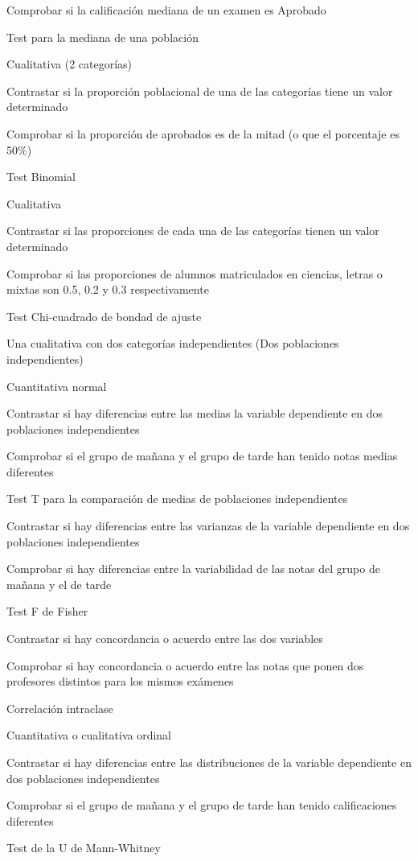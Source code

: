 \documentclass[
  a4paper,
]{scrreport}
\theoremstyle{definition}
\theoremstyle{definition}
\theoremstyle{remark}
\begin{document}
Comprobar si la calificación mediana de un examen es Aprobado

Test para la mediana de una población

Cualitativa (2 categorías)

Contrastar si la proporción poblacional de una de las categorías tiene
un valor determinado

Comprobar si la proporción de aprobados es de la mitad (o que el
porcentaje es 50\%)

Test Binomial

Cualitativa

Contrastar si las proporciones de cada una de las categorías tienen un
valor determinado

Comprobar si las proporciones de alumnos matriculados en ciencias,
letras o mixtas son 0.5, 0.2 y 0.3 respectivamente

Test Chi-cuadrado de bondad de ajuste

Una cualitativa con dos categorías independientes (Dos poblaciones
independientes)

Cuantitativa normal

Contrastar si hay diferencias entre las medias la variable dependiente
en dos poblaciones independientes

Comprobar si el grupo de mañana y el grupo de tarde han tenido notas
medias diferentes

Test T para la comparación de medias de poblaciones independientes

Contrastar si hay diferencias entre las varianzas de la variable
dependiente en dos poblaciones independientes

Comprobar si hay diferencias entre la variabilidad de las notas del
grupo de mañana y el de tarde

Test F de Fisher

Contrastar si hay concordancia o acuerdo entre las dos variables

Comprobar si hay concordancia o acuerdo entre las notas que ponen dos
profesores distintos para los mismos exámenes

Correlación intraclase

Cuantitativa o cualitativa ordinal

Contrastar si hay diferencias entre las distribuciones de la variable
dependiente en dos poblaciones independientes

Comprobar si el grupo de mañana y el grupo de tarde han tenido
calificaciones diferentes

Test de la U de Mann-Whitney
\end{document}
